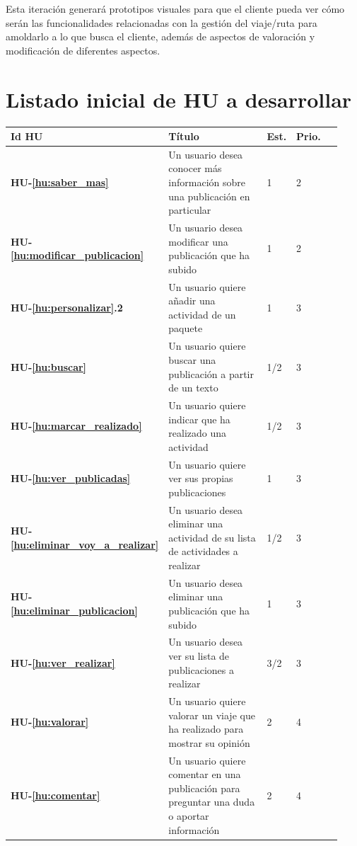 \documentclass[11pt]{article}
\begin{document}
Esta iteración generará prototipos visuales para que el cliente pueda ver cómo serán las funcionalidades relacionadas con la gestión del viaje/ruta para amoldarlo a lo que busca el cliente, además de aspectos de valoración y modificación de diferentes aspectos.

\section{Listado inicial de HU a desarrollar}
\begin{longtable}{p{0.13\linewidth}p{0.65\linewidth}p{0.05\linewidth}p{0.05\linewidth}p{0.05\linewidth}}
  \toprule
  \textbf{Id HU} & \textbf{Título} & \textbf{Est.} & \textbf{Prio.}\\
  \midrule
  \textbf{HU-\ref{hu:saber_mas}} & Un usuario desea conocer más información sobre una publicación en particular & 1 & 2 \\

  \textbf{HU-\ref{hu:modificar_publicacion}} & Un usuario desea modificar una publicación que ha subido & 1 & 2 \\	
  
  \textbf{HU-\ref{hu:personalizar}.2} & Un usuario quiere añadir una actividad de un paquete & 1 & 3 \\ 	

  \textbf{HU-\ref{hu:buscar}} & Un usuario quiere buscar una publicación a partir de un texto & 1/2 & 3 \\

  \textbf{HU-\ref{hu:marcar_realizado}} & Un usuario quiere indicar que ha realizado una actividad & 1/2 & 3 \\
  
  \textbf{HU-\ref{hu:ver_publicadas}} & Un usuario quiere ver sus propias publicaciones & 1 & 3 \\
  
  \textbf{HU-\ref{hu:eliminar_voy_a_realizar}} & Un usuario desea eliminar una actividad de su lista de actividades a realizar & 1/2 & 3 \\	
  
  \textbf{HU-\ref{hu:eliminar_publicacion}} & Un usuario desea eliminar una publicación que ha subido & 1 & 3 \\	
  
    \textbf{HU-\ref{hu:ver_realizar}} & Un usuario desea ver su lista de publicaciones a realizar & 3/2 & 3\\

  \textbf{HU-\ref{hu:valorar}} & Un usuario quiere valorar un viaje que ha realizado para mostrar su opinión & 2 & 4\\

  \textbf{HU-\ref{hu:comentar}} & Un usuario quiere comentar en una publicación para preguntar una duda o aportar información & 2 & 4\\



  
  \bottomrule
\end{longtable}
\end{document}

